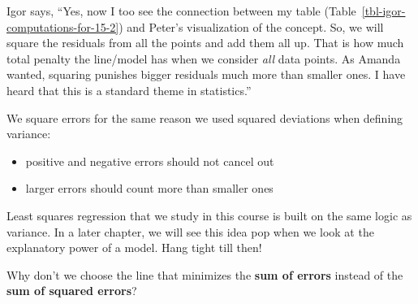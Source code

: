 \documentclass[
  12pt,
  letterpaper,
  DIV=11,
  numbers=noendperiod]{scrreprt}
\providecommand{\tightlist}{%
  \setlength{\itemsep}{0pt}\setlength{\parskip}{0pt}}
\begin{document}
Igor says, ``Yes, now I too see the connection between my table
(Table~\ref{tbl-igor-computations-for-15-2}) and Peter's visualization
of the concept. So, we will square the residuals from all the points and
add them all up. That is how much total penalty the line/model has when
we consider \emph{all} data points. As Amanda wanted, squaring punishes
bigger residuals much more than smaller ones. I have heard that this is
a standard theme in statistics.''

\begin{tcolorbox}[enhanced jigsaw, colback=white, leftrule=.75mm, toprule=.15mm, bottomtitle=1mm, breakable, coltitle=black, toptitle=1mm, title=\textcolor{quarto-callout-important-color}{\faExclamation}\hspace{0.5em}{What's the deal with squaring?}, opacitybacktitle=0.6, colbacktitle=quarto-callout-important-color!10!white, arc=.35mm, left=2mm, colframe=quarto-callout-important-color-frame, titlerule=0mm, rightrule=.15mm, bottomrule=.15mm, opacityback=0]

We square errors for the same reason we used squared deviations when
defining variance:

\begin{itemize}
\tightlist
\item
  positive and negative errors should not cancel out
\item
  larger errors should count more than smaller ones
\end{itemize}

Least squares regression that we study in this course is built on the
same logic as variance. In a later chapter, we will see this idea pop
when we look at the explanatory power of a model. Hang tight till then!

\end{tcolorbox}

\begin{tcolorbox}[enhanced jigsaw, colback=white, leftrule=.75mm, toprule=.15mm, bottomtitle=1mm, breakable, coltitle=black, toptitle=1mm, title=\textcolor{quarto-callout-note-color}{\faInfo}\hspace{0.5em}{Quick Check}, opacitybacktitle=0.6, colbacktitle=quarto-callout-note-color!10!white, arc=.35mm, left=2mm, colframe=quarto-callout-note-color-frame, titlerule=0mm, rightrule=.15mm, bottomrule=.15mm, opacityback=0]

Why don't we choose the line that minimizes the \textbf{sum of errors}
instead of the \textbf{sum of squared errors}?

\end{tcolorbox}
\end{document}
